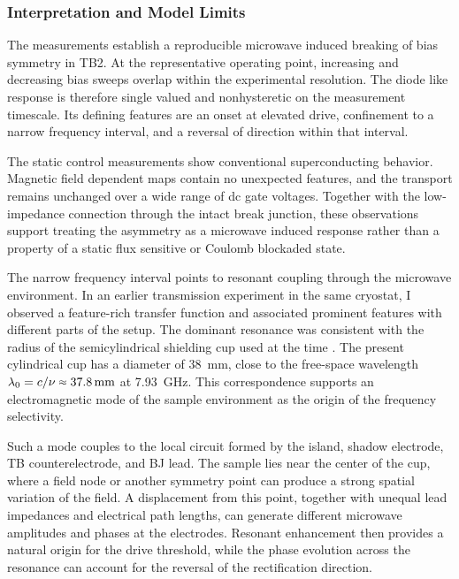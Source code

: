     \subsubsection*{Interpretation and Model Limits}
    \label{subsec:tb:asym:interpretation}

        The measurements establish a reproducible microwave induced breaking of bias symmetry in TB2. At the representative operating point, increasing and decreasing bias sweeps overlap within the experimental resolution. The diode like response is therefore single valued and nonhysteretic on the measurement timescale. Its defining features are an onset at elevated drive, confinement to a narrow frequency interval, and a reversal of direction within that interval.

        The static control measurements show conventional superconducting behavior. Magnetic field dependent maps contain no unexpected features, and the transport remains unchanged over a wide range of dc gate voltages. Together with the low-impedance connection through the intact break junction, these observations support treating the asymmetry as a microwave induced response rather than a property of a static flux sensitive or Coulomb blockaded state.

        The narrow frequency interval points to resonant coupling through the microwave environment. In an earlier transmission experiment in the same cryostat, I observed a feature-rich transfer function and associated prominent features with different parts of the setup. The dominant resonance was consistent with the radius of the semicylindrical shielding cup used at the time \cite{irtenkauf_broadband_2021}. The present cylindrical cup has a diameter of \qty{38}{\milli\meter}, close to the free-space wavelength $\lambda_0=c/\nu\sapprox\qty{37.8}{\milli\meter}$ at \qty{7.93}{\giga\hertz}. This correspondence supports an electromagnetic mode of the sample environment as the origin of the frequency selectivity.

        Such a mode couples to the local circuit formed by the island, shadow electrode, TB counterelectrode, and BJ lead. The sample lies near the center of the cup, where a field node or another symmetry point can produce a strong spatial variation of the field. A displacement from this point, together with unequal lead impedances and electrical path lengths, can generate different microwave amplitudes and phases at the electrodes. Resonant enhancement then provides a natural origin for the drive threshold, while the phase evolution across the resonance can account for the reversal of the rectification direction.

